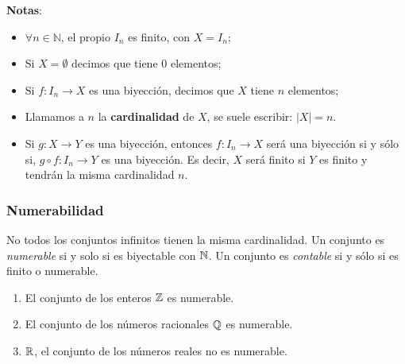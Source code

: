 \textbf{Notas}:
\begin{itemize}
	\item $\forall n \in \mathbb{N} $, el propio $I_n$ es finito, con $X = I_n$;
	\item Si $X = \emptyset$ decimos que tiene 0 elementos;
	\item Si $f: I_n \rightarrow X$ es una biyección, decimos que $X$ tiene $n$ elementos;
	\item Llamamos a $n$ la \textbf{cardinalidad} de $X$, se suele escribir: $|X| = n$.
	\item Si $g: X \rightarrow Y$ es una biyección, entonces $f:I_n \rightarrow X$ será una biyección si y sólo si, $g \circ f:I_n \rightarrow Y$ es una biyección. Es decir, $X$ será finito si $Y$ es finito y tendrán la misma cardinalidad $n$.
\end{itemize}

\subsubsection{Numerabilidad}

No todos los conjuntos infinitos tienen la misma cardinalidad. Un conjunto es \textit{numerable} si y solo si es biyectable con $\mathbb{N}$. Un conjunto es \textit{contable} si y sólo si es finito o numerable.

\begin{fmd-example}
	\begin{enumerate}
		\item El conjunto de los enteros $\mathbb{Z}$ es numerable.
		\item El conjunto de los números racionales $\mathbb{Q}$ es numerable.
		\item $\mathbb{R}$, el conjunto de los números reales no es numerable.
	\end{enumerate}
\end{fmd-example}

